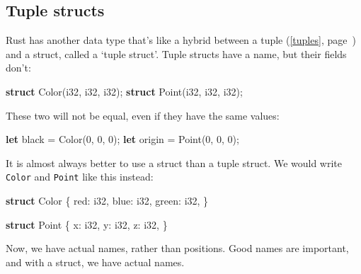 \documentclass[a4paper,]{book}
\renewcommand*{\hyperref}[2][\ar]{%
  \def\ar{#2}%
  #2 (\autoref{#1}, page~\pageref{#1})}
\newenvironment{Shaded}{\begin{snugshade}}{\end{snugshade}}
\newcommand{\KeywordTok}[1]{\textcolor[rgb]{0.13,0.29,0.53}{\textbf{{#1}}}}
\newcommand{\DataTypeTok}[1]{\textcolor[rgb]{0.13,0.29,0.53}{{#1}}}
\newcommand{\DecValTok}[1]{\textcolor[rgb]{0.00,0.00,0.81}{{#1}}}
\newcommand{\NormalTok}[1]{{#1}}
\begin{document}
\subsection{Tuple structs}\label{tuple-structs}

Rust has another data type that's like a hybrid between a
\hyperref[tuples]{tuple} and a struct, called a `tuple struct'. Tuple
structs have a name, but their fields don't:

\begin{Shaded}
\begin{Highlighting}[]
\KeywordTok{struct} \NormalTok{Color(}\DataTypeTok{i32}\NormalTok{, }\DataTypeTok{i32}\NormalTok{, }\DataTypeTok{i32}\NormalTok{);}
\KeywordTok{struct} \NormalTok{Point(}\DataTypeTok{i32}\NormalTok{, }\DataTypeTok{i32}\NormalTok{, }\DataTypeTok{i32}\NormalTok{);}
\end{Highlighting}
\end{Shaded}

These two will not be equal, even if they have the same values:

\begin{Shaded}
\begin{Highlighting}[]
\KeywordTok{let} \NormalTok{black = Color(}\DecValTok{0}\NormalTok{, }\DecValTok{0}\NormalTok{, }\DecValTok{0}\NormalTok{);}
\KeywordTok{let} \NormalTok{origin = Point(}\DecValTok{0}\NormalTok{, }\DecValTok{0}\NormalTok{, }\DecValTok{0}\NormalTok{);}
\end{Highlighting}
\end{Shaded}

It is almost always better to use a struct than a tuple struct. We would
write \texttt{Color} and \texttt{Point} like this instead:

\begin{Shaded}
\begin{Highlighting}[]
\KeywordTok{struct} \NormalTok{Color \{}
    \NormalTok{red: }\DataTypeTok{i32}\NormalTok{,}
    \NormalTok{blue: }\DataTypeTok{i32}\NormalTok{,}
    \NormalTok{green: }\DataTypeTok{i32}\NormalTok{,}
\NormalTok{\}}

\KeywordTok{struct} \NormalTok{Point \{}
    \NormalTok{x: }\DataTypeTok{i32}\NormalTok{,}
    \NormalTok{y: }\DataTypeTok{i32}\NormalTok{,}
    \NormalTok{z: }\DataTypeTok{i32}\NormalTok{,}
\NormalTok{\}}
\end{Highlighting}
\end{Shaded}

Now, we have actual names, rather than positions. Good names are
important, and with a struct, we have actual names.
\end{document}
